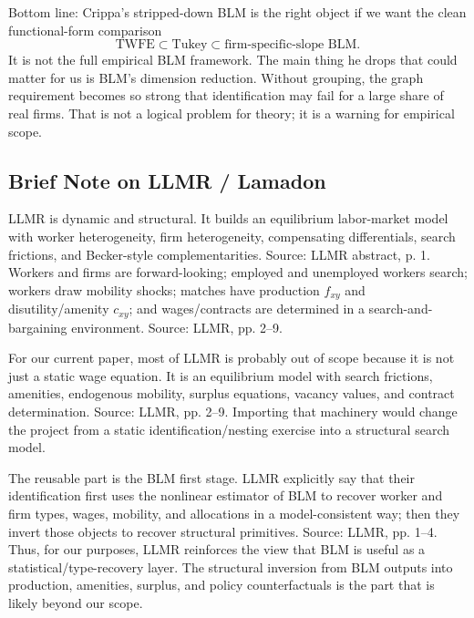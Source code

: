 \documentclass[11pt]{article}
\begin{document}
Bottom line: Crippa's stripped-down BLM is the right object if we want the clean
functional-form comparison
\[
\text{TWFE} \subset \text{Tukey} \subset \text{firm-specific-slope BLM}.
\]
It is not the full empirical BLM framework. The main thing he drops that could matter
for us is BLM's dimension reduction. Without grouping, the graph requirement becomes
so strong that identification may fail for a large share of real firms. That is not a
logical problem for theory; it is a warning for empirical scope.

\subsection{Brief Note on LLMR / Lamadon}

LLMR is dynamic and structural. It builds an equilibrium labor-market model with
worker heterogeneity, firm heterogeneity, compensating differentials, search
frictions, and Becker-style complementarities. Source: LLMR abstract, p. 1. Workers
and firms are forward-looking; employed and unemployed workers search; workers draw
mobility shocks; matches have production $f_{xy}$ and disutility/amenity $c_{xy}$;
and wages/contracts are determined in a search-and-bargaining environment. Source:
LLMR, pp. 2--9.

For our current paper, most of LLMR is probably out of scope because it is not just a
static wage equation. It is an equilibrium model with search frictions, amenities,
endogenous mobility, surplus equations, vacancy values, and contract determination.
Source: LLMR, pp. 2--9. Importing that machinery would change the project from a
static identification/nesting exercise into a structural search model.

The reusable part is the BLM first stage. LLMR explicitly say that their
identification first uses the nonlinear estimator of BLM to recover worker and firm
types, wages, mobility, and allocations in a model-consistent way; then they invert
those objects to recover structural primitives. Source: LLMR, pp. 1--4. Thus, for our
purposes, LLMR reinforces the view that BLM is useful as a statistical/type-recovery
layer. The structural inversion from BLM outputs into production, amenities, surplus,
and policy counterfactuals is the part that is likely beyond our scope.
\end{document}
